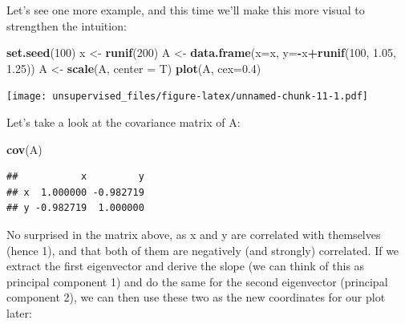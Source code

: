 \documentclass[]{article}
\newenvironment{Shaded}{\begin{snugshade}}{\end{snugshade}}
\newcommand{\DataTypeTok}[1]{\textcolor[rgb]{0.13,0.29,0.53}{#1}}
\newcommand{\DecValTok}[1]{\textcolor[rgb]{0.00,0.00,0.81}{#1}}
\newcommand{\FloatTok}[1]{\textcolor[rgb]{0.00,0.00,0.81}{#1}}
\newcommand{\KeywordTok}[1]{\textcolor[rgb]{0.13,0.29,0.53}{\textbf{#1}}}
\newcommand{\NormalTok}[1]{#1}
\newcommand{\OperatorTok}[1]{\textcolor[rgb]{0.81,0.36,0.00}{\textbf{#1}}}
\newcommand{\StringTok}[1]{\textcolor[rgb]{0.31,0.60,0.02}{#1}}
\begin{document}
Let's see one more example, and this time we'll make this more visual to
strengthen the intuition:

\begin{Shaded}
\begin{Highlighting}[]
\KeywordTok{set.seed}\NormalTok{(}\DecValTok{100}\NormalTok{)}
\NormalTok{x <-}\StringTok{ }\KeywordTok{runif}\NormalTok{(}\DecValTok{200}\NormalTok{)}
\NormalTok{A <-}\StringTok{ }\KeywordTok{data.frame}\NormalTok{(}\DataTypeTok{x=}\NormalTok{x, }\DataTypeTok{y=}\OperatorTok{-}\NormalTok{x}\OperatorTok{+}\KeywordTok{runif}\NormalTok{(}\DecValTok{100}\NormalTok{, }\FloatTok{1.05}\NormalTok{, }\FloatTok{1.25}\NormalTok{))}
\NormalTok{A <-}\StringTok{ }\KeywordTok{scale}\NormalTok{(A, }\DataTypeTok{center =}\NormalTok{ T)}
\KeywordTok{plot}\NormalTok{(A, }\DataTypeTok{cex=}\FloatTok{0.4}\NormalTok{)}
\end{Highlighting}
\end{Shaded}

\texttt{[image: unsupervised\_files/figure-latex/unnamed-chunk-11-1.pdf]}

Let's take a look at the covariance matrix of A:

\begin{Shaded}
\begin{Highlighting}[]
\KeywordTok{cov}\NormalTok{(A)}
\end{Highlighting}
\end{Shaded}

\begin{verbatim}
##           x         y
## x  1.000000 -0.982719
## y -0.982719  1.000000
\end{verbatim}

No surprised in the matrix above, as x and y are correlated with
themselves (hence 1), and that both of them are negatively (and
strongly) correlated. If we extract the first eigenvector and derive the
slope (we can think of this as principal component 1) and do the same
for the second eigenvector (principal component 2), we can then use
these two as the new coordinates for our plot later:

\begin{Shaded}
\end{Shaded}
\end{document}
